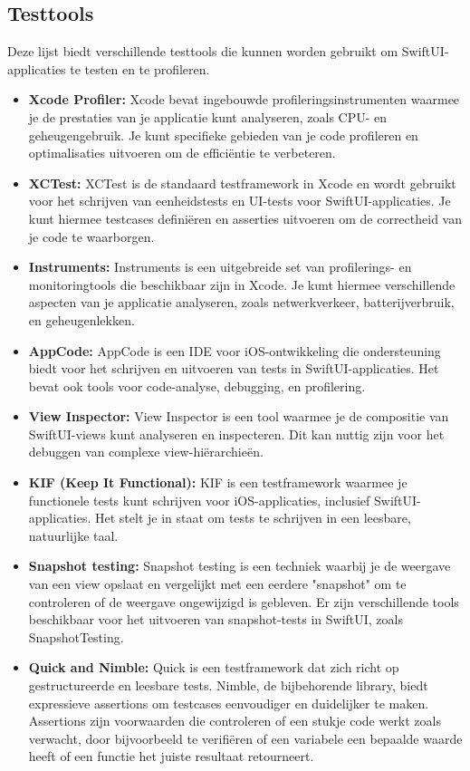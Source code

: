 \subsection{Testtools}
Deze lijst biedt verschillende testtools die kunnen worden gebruikt om SwiftUI-applicaties te testen en te profileren.
\begin{itemize}
    \item {\textbf{Xcode Profiler:} Xcode bevat ingebouwde profileringsinstrumenten waarmee je de prestaties van je applicatie kunt analyseren, zoals CPU- en geheugengebruik. Je kunt specifieke gebieden van je code profileren en optimalisaties uitvoeren om de efficiëntie te verbeteren.}
    \item {\textbf{XCTest:} XCTest is de standaard testframework in Xcode en wordt gebruikt voor het schrijven van eenheidstests en UI-tests voor SwiftUI-applicaties. Je kunt hiermee testcases definiëren en asserties uitvoeren om de correctheid van je code te waarborgen.}
    \item {\textbf{Instruments:} Instruments is een uitgebreide set van profilerings- en monitoringtools die beschikbaar zijn in Xcode. Je kunt hiermee verschillende aspecten van je applicatie analyseren, zoals netwerkverkeer, batterijverbruik, en geheugenlekken.}
    \item {\textbf{AppCode:} AppCode is een IDE voor iOS-ontwikkeling die ondersteuning biedt voor het schrijven en uitvoeren van tests in SwiftUI-applicaties. Het bevat ook tools voor code-analyse, debugging, en profilering.}
    \item {\textbf{View Inspector:} View Inspector is een tool waarmee je de compositie van SwiftUI-views kunt analyseren en inspecteren. Dit kan nuttig zijn voor het debuggen van complexe view-hiërarchieën.}
    \item {\textbf{KIF (Keep It Functional):} KIF is een testframework waarmee je functionele tests kunt schrijven voor iOS-applicaties, inclusief SwiftUI-applicaties. Het stelt je in staat om tests te schrijven in een leesbare, natuurlijke taal.}
    \item {\textbf{Snapshot testing:} Snapshot testing is een techniek waarbij je de weergave van een view opslaat en vergelijkt met een eerdere "snapshot" om te controleren of de weergave ongewijzigd is gebleven. Er zijn verschillende tools beschikbaar voor het uitvoeren van snapshot-tests in SwiftUI, zoals SnapshotTesting.}
    \item {\textbf{Quick and Nimble:} Quick is een testframework dat zich richt op gestructureerde en leesbare tests. Nimble, de bijbehorende library, biedt expressieve assertions om testcases eenvoudiger en duidelijker te maken. Assertions zijn voorwaarden die controleren of een stukje code werkt zoals verwacht, door bijvoorbeeld te verifiëren of een variabele een bepaalde waarde heeft of een functie het juiste resultaat retourneert.}
\end{itemize}
